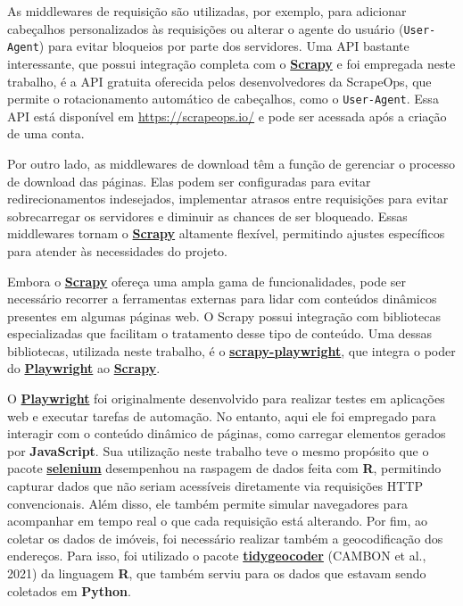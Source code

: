 \documentclass[
  12pt,
  a4paper,
]{scrreprt}
\begin{document}
\vspace{12pt}

As middlewares de requisição são utilizadas, por exemplo, para adicionar
cabeçalhos personalizados às requisições ou alterar o agente do usuário
(\texttt{User-Agent}) para evitar bloqueios por parte dos servidores.
Uma API bastante interessante, que possui integração completa com o
\href{https://docs.scrapy.org/en/latest}{\textbf{Scrapy}} e foi
empregada neste trabalho, é a API gratuita oferecida pelos
desenvolvedores da ScrapeOps, que permite o rotacionamento automático de
cabeçalhos, como o \texttt{User-Agent}. Essa API está disponível em
\url{https://scrapeops.io/} e pode ser acessada após a criação de uma
conta.

\vspace{12pt}

Por outro lado, as middlewares de download têm a função de gerenciar o
processo de download das páginas. Elas podem ser configuradas para
evitar redirecionamentos indesejados, implementar atrasos entre
requisições para evitar sobrecarregar os servidores e diminuir as
chances de ser bloqueado. Essas middlewares tornam o
\href{https://docs.scrapy.org/en/latest}{\textbf{Scrapy}} altamente
flexível, permitindo ajustes específicos para atender às necessidades do
projeto.

\vspace{12pt}

Embora o \href{https://docs.scrapy.org/en/latest}{\textbf{Scrapy}}
ofereça uma ampla gama de funcionalidades, pode ser necessário recorrer
a ferramentas externas para lidar com conteúdos dinâmicos presentes em
algumas páginas web. O Scrapy possui integração com bibliotecas
especializadas que facilitam o tratamento desse tipo de conteúdo. Uma
dessas bibliotecas, utilizada neste trabalho, é o
\href{https://github.com/scrapy-plugins/scrapy-playwright}{\textbf{scrapy-playwright}},
que integra o poder do
\href{https://playwright.dev/python/}{\textbf{Playwright}} ao
\href{https://docs.scrapy.org/en/latest}{\textbf{Scrapy}}.

\vspace{12pt}

O \href{https://playwright.dev/python/}{\textbf{Playwright}} foi
originalmente desenvolvido para realizar testes em aplicações web e
executar tarefas de automação. No entanto, aqui ele foi empregado para
interagir com o conteúdo dinâmico de páginas, como carregar elementos
gerados por \textbf{JavaScript}. Sua utilização neste trabalho teve o
mesmo propósito que o pacote
\href{https://cran.r-project.org/web/packages/selenium/index.html}{\textbf{selenium}}
desempenhou na raspagem de dados feita com \textbf{R}, permitindo
capturar dados que não seriam acessíveis diretamente via requisições
HTTP convencionais. Além disso, ele também permite simular navegadores
para acompanhar em tempo real o que cada requisição está alterando. Por
fim, ao coletar os dados de imóveis, foi necessário realizar também a
geocodificação dos endereços. Para isso, foi utilizado o pacote
\href{https://jessecambon.github.io/tidygeocoder/}{\textbf{tidygeocoder}}
(CAMBON et al., 2021) da linguagem \textbf{R}, que também serviu para os
dados que estavam sendo coletados em \textbf{Python}.
\end{document}
